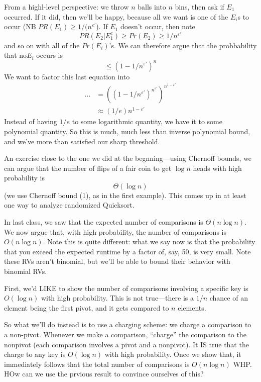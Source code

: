 \documentclass{article}
\begin{document}
From a highl-level perspective: we throw $n$ balls into $n$ bins, then ask if $E_1$ occurred.
If it did, then we'll be happy, because all we want is one of the $E_i$s to occur (NB $PR(E_1) \geq 1 / (n^{\varepsilon'}$).
If $E_1$ doesn't occur, then note
$$
PR(E_2 | E_1^c) \geq Pr(E_2) \geq 1 / {n^{\varepsilon'}}
$$
and so on with all of the $Pr(E_i)$'s.
We can therefore argue that the probbability that no$ E_i$ occurs is
$$
\leq (1 - 1/n^{\varepsilon'})^n
$$
We want to factor this last equation into
\begin{align}
...&=
((1 - 1/n^{\varepsilon'}) ^ {n^{\varepsilon'}} ) ^ {n^{1 - \varepsilon'}}
\\
&\approx
(1/e) n^{1 - \varepsilon'}
\end{align}
Instead of having $1/e$ to some logarithmic quantity, we have it to some polynomial quantity.
So this is much, much less than inverse polynomial bound, and we've more than satisfied our sharp threshold.

An exercise close to the one we did at the begnning---using Chernoff bounds,
we can argue that the number of flips of a fair coin to get $\log n$ heads
with high probability is
$$
\Theta(\log n)
$$
(we use Chernoff bound (1), as in the first example).
This comes up in at least one way to analyze randomized Quicksort.

In last class, we saw that the expected number of comparisons is $\Theta(n\log n)$.
We now argue that, with high probability, the number of comparisons is $O(n\log n)$.
Note this is quite different: what we say now is that the probability that you 
exceed the expected runtime by a factor of, say, 50, is very small.
Note these RVs aren't binomial, but we'll be able to bound their behavior
with binomial RVs.

First, we'd LIKE to show the number of comparisons involving a specific key is $O(\log n)$ with 
high probability.
This is not true---there is a $1/n$ chance of an element being the first
pivot, and it gets compared to $n$ elements.

So what we'll do instead is to use a charging scheme: we charge
a comparison to a non-pivot.
Whenever we make a comparison, ``charge'' the comparison to the nonpivot (each comparison involves a pivot and a nonpivot).
It IS true that the charge to any key is $O(\log n)$ with high probability.
Once we show that, it immediately follows that the total number of comparisons is $O(n\log n)$ WHP.
HOw can we use the prvious result to convince ourselves of this?
\end{document}
